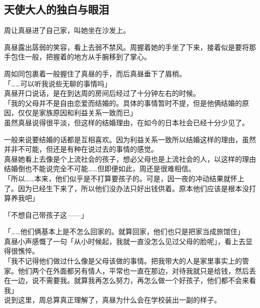 \subsection{天使大人的独白与眼泪}

周让真昼进了自己家，叫她坐在沙发上。

真昼露出孱弱的笑容，看上去弱不禁风。周握着她的手坐了下来，接着似是要将那手包住一般，把握着的地方从手腕移到了掌心。

周如同包裹着一般握住了真昼的手，而后真昼垂下了眉梢。\\

「……可以听我说些无聊的事情吗」\\

真昼开口说话，是在到达周的房间后经过了十分钟左右的时候。\\

「我的父母并不是自由恋爱而结婚的。具体的事情暂时不提，但是他俩结婚的原因，仅仅是家族原因和利益关系一致而已」\\

虽然真昼说得很平淡，但这样的结婚理由，在如今的日本社会已经十分少见了。

一般来说要结婚的话都是互相喜欢。因为利益关系一致所以结婚这样的理由，虽然并非不可能，但还是有种在说过去的事情的感觉。\\

真昼她看上去像是个上流社会的孩子，想必父母也是上流社会的人，以这样的理由结婚倒也不能说完全不可能……但即便如此，周还是很难相信。\\

「所以……本来，他们似乎是不打算要孩子的。可是，因一夜的冲动结果就怀上了。因为已经生下来了，所以他们没办法只好出钱供着。原本他们应该是根本没打算养我吧」

「不想自己带孩子这——」

「……他们俩基本上是不怎么回家的。就算回家，他们也只是把家当成旅馆住」\\

真昼小声感慨了一句「从小时候起，我就一直没怎么见过父母的脸呢」，看上去显得很憔悴。\\

「我不记得他们做过什么像是父母该做的事情。把我带大的人是家里事实上的管家。他们两个在外面都另有情人，平常也一直在那边，对待我就只是给钱，然后丢在一边，说不需要我。就算我再怎么努力，再怎么做一个好孩子，他们都不会来看我」\\

说到这里，周总算真正理解了，真昼为什么会在学校装出一副的样子。\\

